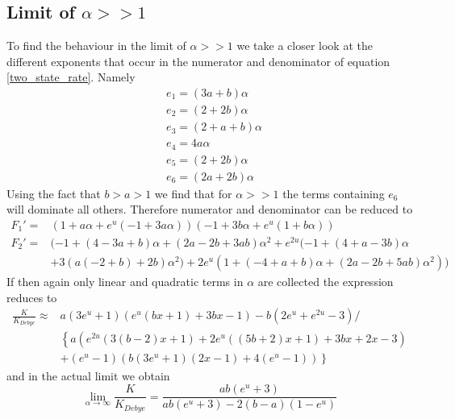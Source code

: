 \subsection{Limit of $\alpha >> 1$}
To find the behaviour in the limit of $\alpha >>1$ we take a closer look at the different exponents that occur in the numerator and denominator of equation \eqref{two_state_rate}. Namely
\begin{align}
& e_1 = (3a+b)\alpha \nonumber \\
& e_2 = (2+2b)\alpha \nonumber \\
& e_3 = (2+a+b)\alpha \nonumber \\
& e_4 = 4a\alpha \nonumber \\
& e_5 = (2+2b)\alpha \nonumber \\
& e_6 = (2a+2b)\alpha
\end{align}
Using the fact that $b > a > 1$ we find that for $\alpha >>1$ the terms containing $e_6$ will dominate all others. Therefore numerator and denominator can be reduced to
\begin{align*}
    F_1' =& ( 1 + a \alpha + e^u (-1 + 3 a \alpha)) (-1 + 3 b \alpha + e^u (1 + b \alpha))\\
    F_2' =& (-1 + (4 - 3 a + b) \alpha + (2 a - 2 b + 3 a b) \alpha^2 + e^{2 u} (-1 + (4 + a - 3 b) \alpha \\
          &+ 3 (a (-2 + b) + 2 b) \alpha^2) + 2 e^u (1 + (-4 + a + b) \alpha + (2 a - 2 b + 5 a b) \alpha^2))
\end{align*}
If then again only linear and quadratic terms in $\alpha$ are collected the expression reduces to 
\begin{align}
    \frac{K}{K_{Debye}} \approx &a \left(3 e^u+1\right) \left(e^u (b x+1)+3 b x-1\right)-b \left(2 e^u+e^{2 u}-3\right) / \nonumber \\
                          &\left\{a \left(e^{2 u} (3 (b-2) x+1)+2 e^u ((5 b+2) x+1)+3 b x+2 x-3\right) \right.  \nonumber \\
                          & \left. +\left(e^u-1\right) \left(b \left(3 e^u+1\right) (2 x-1)+4 \left(e^u-1\right)\right) \right\}
    \label{kla}
\end{align}
and in the actual limit we obtain 
\begin{equation}
    \lim_{\alpha \rightarrow \infty} \frac{K}{K_{Debye}} = \frac{a b \left(e^u+3\right)}{ab \left(e^u+3\right)-2(b-a)(1-e^u)}
    \label{kliminfa}
\end{equation}
